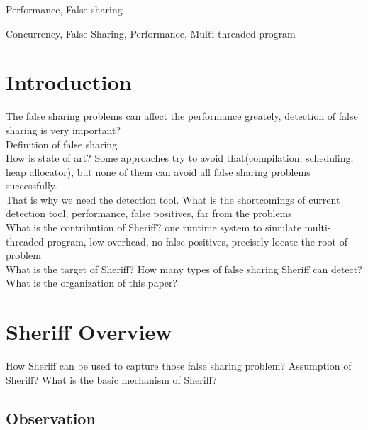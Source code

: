 \documentclass[10pt]{sigplanconf}
\begin{document}
\begin{abstract}
\end{abstract}

\terms
Performance, False sharing

\keywords
Concurrency, False Sharing, Performance, Multi-threaded program


\section{Introduction}

The false sharing problems can affect the performance greately, detection of false sharing is very important? \\
Definition of false sharing\\
How is state of art? Some approaches try to avoid that(compilation, scheduling, heap allocator), but none of them 
can avoid all false sharing problems successfully. \\
That is why we need the detection tool. What is the shortcomings of current detection tool, performance, false positives, far from the problems \\
What is the contribution of Sheriff? one runtime system to simulate multi-threaded program, low overhead, no false positives, precisely locate the root of problem\\
What is the target of Sheriff? How many types of false sharing Sheriff can detect? \\ 
What is the organization of this paper? \\

\section{Sheriff Overview}

How Sheriff can be used to capture those false sharing problem? Assumption of Sheriff? 
What is the basic mechanism of Sheriff? 
\subsection{Observation}
\end{document}
